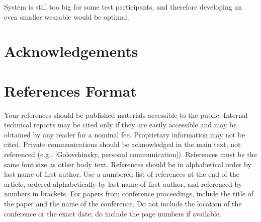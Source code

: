 \documentclass{sigchi}
\begin{document}
System is still too big for some test participants, and therefore developing an even smaller wearable would be optimal. 

\section{Acknowledgements}

%
%
%
%
%
\balance{}

\section{References Format}
Your references should be published materials accessible to the
public. Internal technical reports may be cited only if they are
easily accessible and may be obtained by any reader for a nominal
fee. Proprietary information may not be cited. Private communications
should be acknowledged in the main text, not referenced (e.g.,
[Golovchinsky, personal communication]). References must be the same
font size as other body text. References should be in alphabetical
order by last name of first author. Use a numbered list of references
at the end of the article, ordered alphabetically by last name of
first author, and referenced by numbers in brackets. For papers from
conference proceedings, include the title of the paper and the name of
the conference. Do not include the location of the conference or the
exact date; do include the page numbers if available. 
\end{document}
